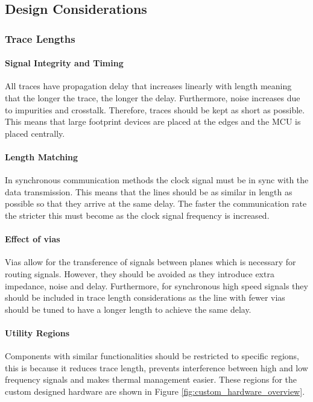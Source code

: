 \subsection{Design Considerations}\label{sub_section:tgt_design_considerations}

\subsubsection{Trace Lengths}\label{sub_sub_section:tgt_trace_lengths}
\paragraph{Signal Integrity and Timing}
All traces have propagation delay that increases linearly with length meaning that the longer the trace, the longer the delay. Furthermore, noise increases due to impurities and crosstalk. Therefore, traces should be kept as short as possible. This means that large footprint devices are placed at the edges and the \gls{MCU} is placed centrally.
\paragraph{Length Matching}
In synchronous communication methods the clock signal must be in sync with the data transmission. This means that the lines should be as similar in length as possible so that they arrive at the same delay. The faster the communication rate the stricter this must become as the clock signal frequency is increased.
\paragraph{Effect of vias}
Vias allow for the transference of signals between planes which is necessary for routing signals. However, they should be avoided as they introduce extra impedance, noise and delay. Furthermore, for synchronous high speed signals they should be included in trace length considerations as the line with fewer vias should be tuned to have a longer length to achieve the same delay.
\paragraph{Utility Regions}
Components with similar functionalities should be restricted to specific regions, this is because it reduces trace length, prevents interference between high and low frequency signals and makes thermal management easier. These regions for the custom designed hardware are shown in Figure \ref{fig:custom_hardware_overview}.

